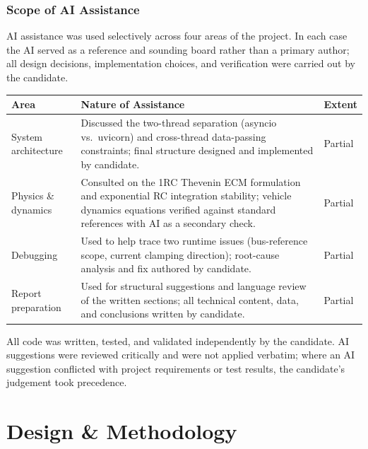 \documentclass[12pt, a4paper, openany]{report}
\begin{document}
\subsection{Scope of AI Assistance}

AI assistance was used selectively across four areas of the project.
In each case the AI served as a reference and sounding board rather than
a primary author; all design decisions, implementation choices, and
verification were carried out by the candidate.

\begin{center}
\begin{tabularx}{\textwidth}{lXl}
  \toprule
  \rowcolor{TblHead}
  \color{white}\textbf{Area} &
  \color{white}\textbf{Nature of Assistance} &
  \color{white}\textbf{Extent} \\
  \midrule
  System architecture
    & Discussed the two-thread separation (asyncio vs.\ uvicorn) and
      cross-thread data-passing constraints; final structure designed
      and implemented by candidate.
    & Partial \\
  \rowcolor{TblAlt}
  Physics \& dynamics
    & Consulted on the 1RC Thevenin ECM formulation and exponential RC
      integration stability; vehicle dynamics equations verified against
      standard references with AI as a secondary check.
    & Partial \\
  Debugging
    & Used to help trace two runtime issues (bus-reference scope,
      current clamping direction); root-cause analysis and fix
      authored by candidate.
    & Partial \\
  \rowcolor{TblAlt}
  Report preparation
    & Used for structural suggestions and language review of the written
      sections; all technical content, data, and conclusions written
      by candidate.
    & Partial \\
  \bottomrule
\end{tabularx}
\end{center}

All code was written, tested, and validated independently by the candidate.
AI suggestions were reviewed critically and were not applied verbatim;
where an AI suggestion conflicted with project requirements or test results,
the candidate's judgement took precedence.

\chapter{Design \& Methodology}
\end{document}
